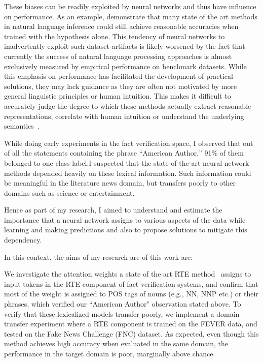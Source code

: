 \documentclass{article}
\begin{document}
These biases can be readily exploited by neural networks and thus have influence on performance.  As an example, \citep*{gururangan2018annotation} demonstrate that many state of the art methods in natural language inference could still achieve reasonable accuracies when trained with the hypothesis alone. This tendency of neural networks to inadvertently exploit such dataset artifacts is likely worsened by the fact that currently the success of natural language processing approaches is almost exclusively measured by empirical performance on benchmark datasets. While this emphasis on performance has facilitated the development of practical solutions, they may lack guidance as they are often not motivated by more general linguistic principles or human intuition. This makes it difficult to accurately judge the degree to which these methods actually extract reasonable representations, correlate with  human intuition or understand the underlying semantics~\citep*{dagan2013recognizing}.



While doing  early experiments in the fact verification space, I observed that out of all the statements containing the phrase ``American Author,'' 91\% of them belonged to one class label.I suspected that the state-of-the-art neural network methods depended heavily on these lexical information. Such information could be meaningful in the literature news domain, but transfers poorly to other domains such as science or entertainment.  


Hence as part of my research, I aimed to understand and estimate the importance that a neural network assigns to various aspects of the data while learning and making predictions and also to propose solutions to mitigate this dependency.


In this context, the aims of my research are of this work are:




{\flushleft {}}

{} We investigate the attention weights a state of the art RTE method~\cite{parikh2016decomposable} assigns to input tokens in the RTE component of fact verification systems, and confirm that most of the weight is assigned to POS tags of nouns (e.g., NN, NNP etc.) or their phrases, which verified our ``American Author" observation stated above.
{}  To verify that these lexicalized models transfer poorly, we implement a domain transfer experiment where a RTE component is trained on the FEVER data, and tested on the Fake News Challenge (FNC) \citep{pomerleau2017fake} dataset. As expected, even though this method achieves high accuracy when evaluated in the same domain, the performance in the target domain is poor, marginally above chance.
\end{document}
